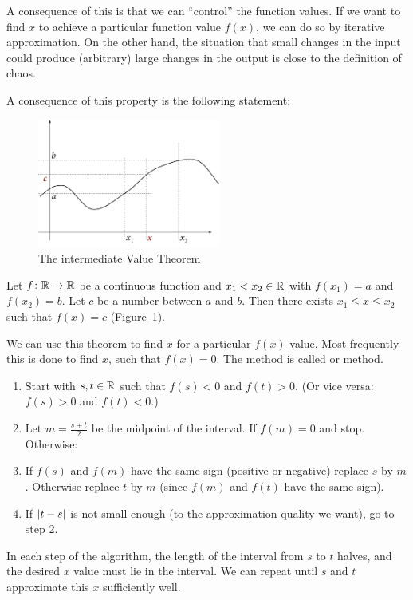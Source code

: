 A consequence of this is that we can ``control'' the function values. If we want to find
$x$ to achieve a particular function value $f(x)$, we can do so by iterative
approximation. On the other hand, the situation that small changes in the input could
produce (arbitrary) large changes in the output is close to the definition of chaos.
\smallskip

A consequence of this property is the following statement:
\begin{figure}
\begin{center}
\includegraphics[width=6cm]{pic/IntermedThm.pdf}
\end{center}
\caption{The intermediate Value Theorem}
\label{figivt}
\end{figure}
\begin{thm}
Let $f\colon{\mathbb R}\to{\mathbb R}$ be a continuous function and $x_1<x_2\in{\mathbb R}$ with $f(x_1)=a$ and
$f(x_2)=b$. Let $c$ be a number between $a$ and $b$. Then there exists $x_1\le x\le x_2$
such that $f(x)=c$ (Figure~\ref{figivt}).
\end{thm}

We can use this theorem to find $x$ for a particular $f(x)$-value. Most frequently this
is done to find $x$, such that $f(x)=0$. The method is called  or  method.
\begin{enumerate}
\item
Start with $s,t\in{\mathbb R}$ such that $f(s)<0$ and $f(t)>0$. (Or vice versa: $f(s)>0$ and
$f(t)<0$.)
\item Let $m=\frac{s+t}{2}$ be the midpoint of the interval. If $f(m)=0$ and
stop. Otherwise:
\item If $f(s)$ and $f(m)$ have the same sign (positive or negative) replace $s$ by $m$.
Otherwise replace $t$ by $m$ (since $f(m)$ and $f(t)$ have the same sign).
\item If $\left|t-s\right|$ is not small enough (to the approximation quality we want), go to
step 2.
\end{enumerate}
In each step of the algorithm, the length of the interval from $s$ to $t$ halves, and
the desired $x$ value must lie in the interval. We can repeat until $s$ and $t$
approximate this $x$ sufficiently well.

